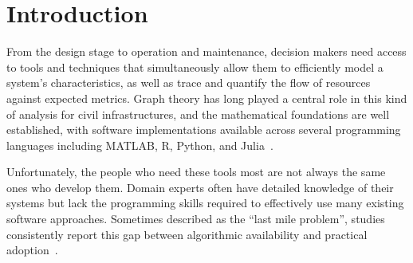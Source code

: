 \documentclass[twocolumn]{rps-esrel2026}
\begin{document}


\section{Introduction}

From the design stage to operation and maintenance, decision makers need access to tools and techniques that simultaneously allow them to efficiently model a system's characteristics, as well as trace and quantify the flow of resources against expected metrics. Graph theory has long played a central role in this kind of analysis for civil infrastructures, and the mathematical foundations are well established, with software implementations available across several programming languages including MATLAB, R, Python, and Julia~\cite{pearl1988probabilistic, koller2009probabilistic, ferson2015}.

Unfortunately, the people who need these tools most are not always the same ones who develop them. Domain experts often have detailed knowledge of their systems but lack the programming skills required to effectively use many existing software approaches. Sometimes described as the ``last mile problem'', studies consistently report this gap between algorithmic availability and practical adoption~\cite{hannay2009scientists, prabhu2011survey}.
\end{document}
